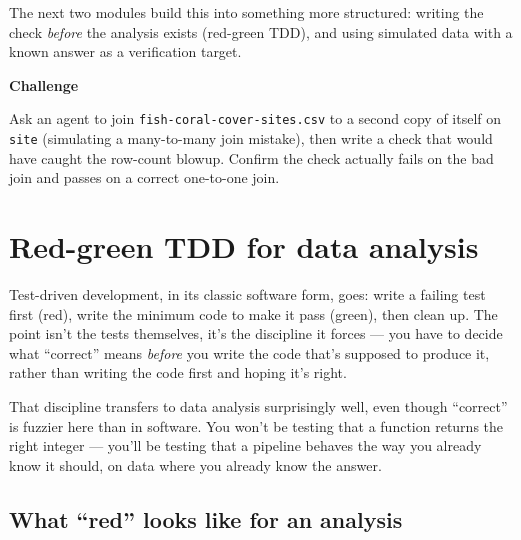 \documentclass[
  letterpaper,
  DIV=11,
  numbers=noendperiod]{scrreprt}
\begin{document}
The next two modules build this into something more structured: writing
the check \emph{before} the analysis exists (red-green TDD), and using
simulated data with a known answer as a verification target.

\begin{tcolorbox}[enhanced jigsaw, toprule=.15mm, rightrule=.15mm, left=2mm, leftrule=.75mm, breakable, opacityback=0, arc=.35mm, colframe=quarto-callout-important-color-frame, bottomrule=.15mm, colback=white]
\begin{minipage}[t]{5.5mm}
\textcolor{quarto-callout-important-color}{\faExclamation}
\end{minipage}%
\begin{minipage}[t]{\textwidth - 5.5mm}

\vspace{-3mm}\textbf{Challenge}\vspace{3mm}

Ask an agent to join \texttt{fish-coral-cover-sites.csv} to a second
copy of itself on \texttt{site} (simulating a many-to-many join
mistake), then write a check that would have caught the row-count
blowup. Confirm the check actually fails on the bad join and passes on a
correct one-to-one join.

\end{minipage}%
\end{tcolorbox}

\chapter{Red-green TDD for data
analysis}\label{red-green-tdd-for-data-analysis}

Test-driven development, in its classic software form, goes: write a
failing test first (red), write the minimum code to make it pass
(green), then clean up. The point isn't the tests themselves, it's the
discipline it forces --- you have to decide what ``correct'' means
\emph{before} you write the code that's supposed to produce it, rather
than writing the code first and hoping it's right.

That discipline transfers to data analysis surprisingly well, even
though ``correct'' is fuzzier here than in software. You won't be
testing that a function returns the right integer --- you'll be testing
that a pipeline behaves the way you already know it should, on data
where you already know the answer.

\section{What ``red'' looks like for an
analysis}\label{what-red-looks-like-for-an-analysis}
\end{document}
